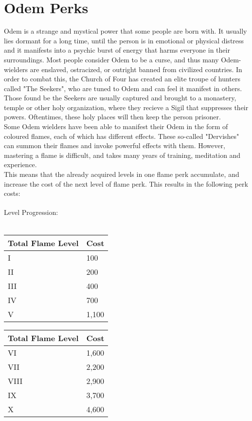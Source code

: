 \chapter{Odem Perks}\label{ch:odemPerks}
Odem is a strange and mystical power that some people are born with.
It usually lies dormant for a long time, until the person is in emotional or physical distress and it manifests into a psychic burst of energy that harms everyone in their surroundings.
Most people consider Odem to be a curse, and thus many Odem-wielders are enslaved, ostracized, or outright banned from civilized countries.
In order to combat this, the Church of Four has created an elite troupe of hunters called "The Seekers", who are tuned to Odem and can feel it manifest in others.
Those found be the Seekers are usually captured and brought to a monastery, temple or other holy organization, where they recieve a Sigil that suppresses their powers.
Oftentimes, these holy places will then keep the person prisoner.\\
Some Odem wielders have been able to manifest their Odem in the form of coloured flames, each of which has different effects.
These so-called "Dervishes" can summon their flames and invoke powerful effects with them.
However, mastering a flame is difficult, and takes many years of training, meditation and experience.\\
This means that the already acquired levels in one flame perk accumulate, and increase the cost of the next level of flame perk.
This results in the following perk costs:\\
\\
Level Progression:\\
\\
\begin{minipage}{0.30\textwidth}
    \begin{tabular}{l | l}
        Total Flame Level & Cost\\ \hline
        I & 100\\
        II & 200\\
        III & 400\\
        IV & 700\\
        V & 1,100\\
    \end{tabular}
\end{minipage}
\begin{minipage}{0.30\textwidth}
    \begin{tabular}{l | l}
        Total Flame Level & Cost\\ \hline
        VI & 1,600\\
        VII & 2,200\\
        VIII & 2,900\\
        IX & 3,700\\
        X & 4,600\\
    \end{tabular}
\end{minipage}
